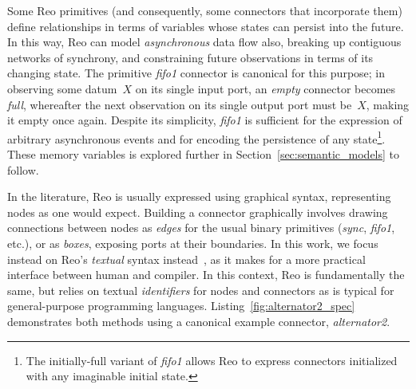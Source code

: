 Some Reo primitives (and consequently, some connectors that incorporate them) define relationships in terms of variables whose states can persist into the future. In this way, Reo can model \textit{asynchronous} data flow also, breaking up contiguous networks of synchrony, and constraining future observations in terms of its changing state. The primitive \textit{fifo1} connector is canonical for this purpose; in observing some datum~$X$ on its single input port, an \textit{empty} connector becomes \textit{full}, whereafter the next observation on its single output port must be~$X$, making it empty once again. Despite its simplicity, \textit{fifo1} is sufficient for the expression of arbitrary asynchronous events and for encoding the persistence of any state\footnote{The initially-full variant of \textit{fifo1} allows Reo to express connectors initialized with any imaginable initial state.}. These memory variables is explored further in Section~\ref{sec:semantic_models} to follow.

In the literature, Reo is usually expressed using graphical syntax, representing nodes as one would expect. Building a connector graphically involves drawing connections between nodes as \textit{edges} for the usual binary primitives (\textit{sync}, \textit{fifo1}, etc.), or as \textit{boxes}, exposing ports at their boundaries. In this work, we focus instead on Reo's \textit{textual} syntax instead~\cite{dokter2018treo}, as it makes for a more practical interface between human and compiler. In this context, Reo is fundamentally the same, but relies on textual \textit{identifiers} for nodes and connectors as is typical for general-purpose programming languages. Listing~\ref{fig:alternator2_spec} demonstrates both methods using a canonical example connector, \textit{alternator2}.


